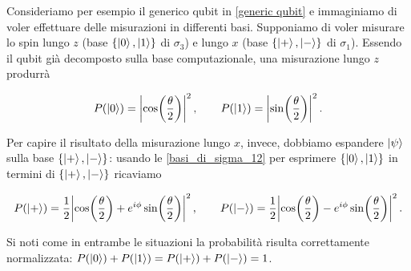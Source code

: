 \begin{esempio}
    Consideriamo per esempio il generico qubit in \eqref{generic qubit} e immaginiamo di voler effettuare delle misurazioni in differenti basi. Supponiamo di voler misurare lo spin lungo $z$ (base $\lbrace \ket{0}, \ket{1} \rbrace$ di $\sigma_3$) e lungo $x$ (base $\lbrace \ket{+}, \ket{-} \rbrace$ di $\sigma_1$). Essendo il qubit già decomposto sulla base computazionale, una misurazione lungo $z$ produrrà
    
    \begin{equation*}
        P(\ket{0}) = \abs{\cos \! \left( \frac{\theta}{2} \right)}^2 \, , \qquad P(\ket{1}) = \abs{\sin \! \left( \frac{\theta}{2} \right)}^2 \, .
    \end{equation*}
    
    \noindent Per capire il risultato della misurazione lungo $x$, invece, dobbiamo espandere $\ket{\psi}$ sulla base $\lbrace \ket{+}, \ket{-} \rbrace$: usando le \eqref{basi_di_sigma_12} per esprimere $\lbrace \ket{0}, \ket{1} \rbrace$ in termini di $\lbrace \ket{+}, \ket{-} \rbrace$ ricaviamo
    
    \begin{equation*}
        P(\ket{+}) = \frac{1}{2} \abs{\cos \! \left( \frac{\theta}{2} \right) + e^{i \phi} \sin \! \left( \frac{\theta}{2} \right)}^2 \, , \qquad P(\ket{-}) = \frac{1}{2} \abs{\cos \! \left( \frac{\theta}{2} \right) - e^{i \phi} \sin \! \left( \frac{\theta}{2} \right)}^2 \, .
    \end{equation*}
    
    \noindent Si noti come in entrambe le situazioni la probabilità risulta correttamente normalizzata: $P(\ket{0}) + P(\ket{1}) = P(\ket{+}) + P(\ket{-}) = 1$. 
\end{esempio}

